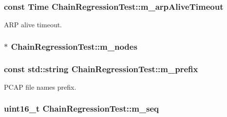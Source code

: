 \subsubsection[{\texorpdfstring{m\+\_\+arp\+Alive\+Timeout}{m_arpAliveTimeout}}]{\setlength{\rightskip}{0pt plus 5cm}const {\bf Time} Chain\+Regression\+Test\+::m\+\_\+arp\+Alive\+Timeout\hspace{0.3cm}{\ttfamily [private]}}\hypertarget{classChainRegressionTest_a7dda0494d54670d515ff7821993710de}{}\label{classChainRegressionTest_a7dda0494d54670d515ff7821993710de}


A\+RP alive timeout. 

\subsubsection[{\texorpdfstring{m\+\_\+nodes}{m_nodes}}]{$\ast$ Chain\+Regression\+Test\+::m\+\_\+nodes\hspace{0.3cm}{\ttfamily [private]}}\hypertarget{classChainRegressionTest_a9df3157b70f521bddeb6184f0e7c48a3}{}\label{classChainRegressionTest_a9df3157b70f521bddeb6184f0e7c48a3}
\subsubsection[{\texorpdfstring{m\+\_\+prefix}{m_prefix}}]{\setlength{\rightskip}{0pt plus 5cm}const std\+::string Chain\+Regression\+Test\+::m\+\_\+prefix\hspace{0.3cm}{\ttfamily [private]}}\hypertarget{classChainRegressionTest_ac11ece02445e290f10eef8c73542b60a}{}\label{classChainRegressionTest_ac11ece02445e290f10eef8c73542b60a}


P\+C\+AP file names prefix. 

\subsubsection[{\texorpdfstring{m\+\_\+seq}{m_seq}}]{\setlength{\rightskip}{0pt plus 5cm}uint16\+\_\+t Chain\+Regression\+Test\+::m\+\_\+seq\hspace{0.3cm}{\ttfamily [private]}}\hypertarget{classChainRegressionTest_a4b038b8f43087a96aaa1b94d6f351733}{}\label{classChainRegressionTest_a4b038b8f43087a96aaa1b94d6f351733}


